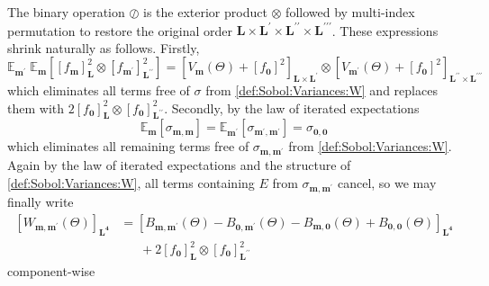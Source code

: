 \documentclass[preprint,12pt]{elsarticle}
\newcommand*{\x}{\times}
\newcommand*{\mi}[1]{\mathbf{#1}}
\newcommand*{\te}[2][]{\left\lbrack{#2}\right\rbrack_{#1}}
\newcommand*{\ev}[3][]{\mathbb{E}_{#3}^{#1}\!\left\lbrack{#2}\right\rbrack}
\newcommand*{\evt}[3][]{\mathbb{E}_{#3}^{#1}\!#2}
\begin{document}
            The binary operation $\oslash$ is the exterior product $\otimes$ followed by multi-index permutation to restore the original order $\mi{L\x L^{\prime}\x L^{\prime\prime}\x L^{\prime\prime\prime}}$.
            These expressions shrink naturally as follows. Firstly,
            \begin{equation*}
                \evt{\;\ev{\te[\mi{L}]{f_{\mi{m}}}^{2} \otimes \te[\mi{L^{\prime\prime}}]{f_{\mi{m^{\prime}}}}^{2}}{\mi{m}}}{\mi{m^{\prime}}} = \te[\mi{L\x L^{\prime}}]{{V_{\mi{m}}(\Theta)} + \te[\,]{f_{\mi{0}}}^{2}} \otimes
                \te[\mi{L^{\prime\prime}\x L^{\prime\prime\prime}}]{{V_{\mi{m^{\prime}}}(\Theta)} + \te[\,]{f_{\mi{0}}}^{2}}
            \end{equation*}
            which eliminates all terms free of $\sigma$ from \cref{def:Sobol:Variances:W} and replaces them with $2 \te[\mi{L}]{f_{\mi{0}}}^{2} \otimes \te[\mi{L^{\prime\prime}}]{f_{\mi{0}}}^{2}$. Secondly, by the law of iterated expectations
            \begin{equation*}
                \ev{\sigma_{\mi{m,m}}}{\mi{m}} = \ev{\sigma_{\mi{m^{\prime},m^{\prime}}}}{\mi{m^{\prime}}} = \sigma_{\mi{0,0}}
            \end{equation*}
            which eliminates all remaining terms free of $\sigma_{\mi{m,m^{\prime}}}$ from \cref{def:Sobol:Variances:W}. Again by the law of iterated expectations and the structure of \cref{def:Sobol:Variances:W}, all terms containing $E$ from $\sigma_{\mi{m,m^{\prime}}}$ cancel, so we may finally write
            \begin{equation} \label{def:Sobol:Variances:W2}
                \begin{aligned}
                    \te[\mi{L^4}]{W_{\mi{m},\mi{m^{\prime}}}(\Theta)} &= \te[\mi{L^4}]{B_{\mi{m,m^{\prime}}}(\Theta)-B_{\mi{0,m^{\prime}}}(\Theta)-B_{\mi{m,0}}(\Theta)+B_{\mi{0,0}}(\Theta)} \\
                    &\phantom{=}\  +2 \te[\mi{L}]{f_{\mi{0}}}^{2} \otimes \te[\mi{L^{\prime\prime}}]{f_{\mi{0}}}^{2}
                \end{aligned}
            \end{equation}
            component-wise
\end{document}
